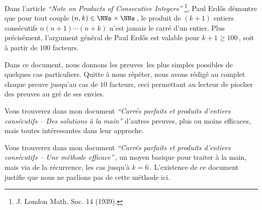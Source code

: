 Dans l'article \emph{\enquote{Note on Products of Consecutive Integers}}
\footnote{
	J. London Math. Soc. 14 (1939).
},
Paul Erdős démontre que pour tout couple $(n, k) \in \NNs \times \NNs$\,, le produit de $(k+1)$ entiers consécutifs $n (n + 1) \cdots (n + k)$ n'est jamais le carré d'un entier. 
Plus précisément, l'argument général de Paul Erdős est valable pour $k + 1 \geq 100$\,, soit à partir de $100$ facteurs.

\medskip

Dans ce document, nous donnons les preuves les plus simples possibles de quelques cas particuliers. Quitte à nous répéter, nous avons rédigé au complet chaque preuve jusqu'au cas de $10$ facteurs, ceci permettant au lecteur de piocher des preuves au gré de ses envies.


\begin{remark}
	Vous trouverez dans mon document \emph{\enquote{Carrés parfaits et produits d'entiers consécutifs -- Des solutions à la main}} d'autres preuves, plus ou moins efficaces, mais toutes intéressantes dans leur approche.
\end{remark}


\begin{remark}
	Vous trouverez dans mon document \emph{\enquote{Carrés parfaits et produits d'entiers consécutifs -- Une méthode efficace}}\,, un moyen basique pour traiter à la main, mais via de la récurrence, les cas jusqu'à $k = 6$\,.
	L'existence de ce document justifie que nous ne parlions pas de cette méthode ici.
\end{remark}

